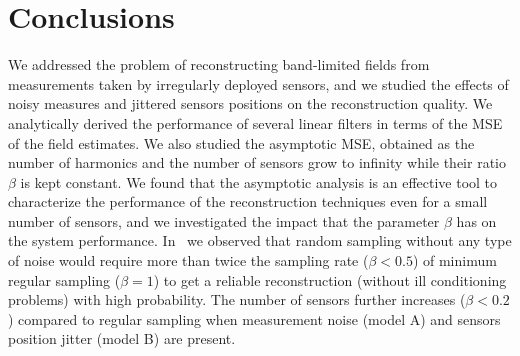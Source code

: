 \documentclass[final, a4paper]{IEEEtran}
\begin{document}
\section{Conclusions\label{sec:conclusions}}
We addressed the problem of reconstructing band-limited fields from
measurements taken by irregularly deployed sensors, and we studied
the effects of noisy measures and jittered sensors positions on the reconstruction quality.
We analytically derived
the performance of several linear filters in terms of
the MSE of the field estimates. We also studied
the asymptotic MSE, obtained as the number of harmonics and the number of
sensors grow to infinity while their ratio $\beta$ is kept constant.
We found that the asymptotic analysis is an effective tool to characterize the
performance of the reconstruction techniques
even for a small number of sensors, and we investigated the impact
that the parameter $\beta$ has on the system performance.
In~\cite{NordioChiasseriniViterbo} we observed that random sampling without any type of noise
would require more than twice the sampling rate ($\beta<0.5$) of minimum regular sampling ($\beta=1$)
to get a reliable reconstruction (without ill conditioning problems) with high probability.
The number of sensors further increases ($\beta<0.2$) compared to regular sampling when measurement
noise (model A) and sensors position jitter (model B) are present.
\end{document}
